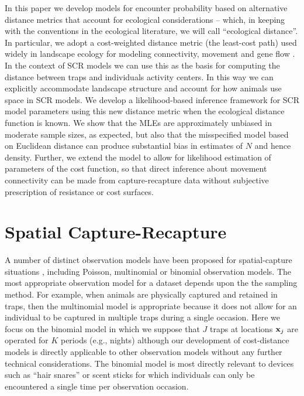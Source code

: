 \documentclass[12pt]{article}
\begin{document}
In this paper we develop models for encounter probability based on
alternative distance metrics that account for ecological
considerations -- which, in keeping with the conventions in the
ecological literature, we will call ``ecological distance''. In
particular, we adopt a cost-weighted distance metric (the least-cost path)
used widely in landscape ecology for modeling connectivity,
movement and gene flow
\citep{adriaensen_etal:2003,manel_etal:2003,mcrae_etal:2008}. In the
context of SCR models we can use this as the basis for computing the
distance between traps and individuals activity centers. In this way
we can explicitly accommodate landscape structure and
account for how animals use space in SCR models. We develop a
likelihood-based inference framework for SCR model parameters using
this new distance metric when the ecological distance function is
known.  We show that the MLEs are approximately unbiased in moderate
sample sizes, as expected, but also that the misspecified model based
on Euclidean distance can produce substantial bias in estimates of $N$
and hence density.  Further, we extend the model to allow for likelihood 
estimation of parameters of the cost function, so that direct inference
about movement connectivity can be made from capture-recapture data without subjective prescription
of resistance or cost surfaces.


\section{Spatial Capture-Recapture}

A number of distinct observation models have been proposed for
spatial-capture situations \citep{borchers_efford:2008,
  royle_etal:2009ecol, efford_etal:2009ecol}, including Poisson, multinomial or binomial
observation models. The most
appropriate observation model for a dataset depends upon the the
sampling method.
For example, when animals are physically captured and retained
in traps, then the multinomial model is appropriate because it does not
allow for an individual to be captured in multiple traps during a
single occasion. Here we focus on the binomial model in which we
suppose that $J$ traps at locations ${\bf x}_{j}$ are operated for $K$
periods (e.g., nights) although our development of cost-distance
models is directly applicable to other observation models without any
further technical considerations. The binomial model is most directly
relevant to devices such as ``hair snares''
\citep{woods_etal:1999,gardner_etal:2010} or scent sticks
\citep{kery_etal:2010} for which individuals can only be encountered a
single time per observation occasion.
\end{document}

